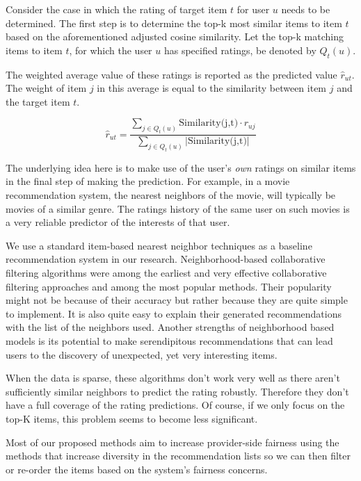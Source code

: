        
        Consider the case in which the rating of target item $t$ for user $u$ needs to be determined. The first step is to determine the top-k most similar items to item $t$ based on the aforementioned adjusted cosine similarity. Let the top-k matching items to item $t$, for which the user $u$ has specified ratings, be denoted by $Q_{t}(u)$.

        The weighted average value of these ratings is reported as the predicted value $\hat{r}_{ut}$. The weight of item $j$ in this average is equal to the similarity between item $j$ and the target item $t$. 
        
        \begin{equation}
            \hat{r}_{ut} = \frac{\sum_{j \in Q_{t}(u)} \text{Similarity(j,t)} \cdot r_{uj}}{\sum_{j \in Q_{t}(u)} |\text{Similarity(j,t)}|}
        \end{equation}
        
        The underlying idea here is to make use of the user’s \textit{own} ratings on similar items in the final step of making the prediction. For example, in a movie recommendation system, the nearest neighbors of the movie, will typically be movies of a similar genre. The ratings history of the same user on such movies is a very reliable predictor of the interests of that user.
        
        We use a standard item-based nearest neighbor techniques \cite{desrosiers2011comprehensive} as a baseline recommendation system in our research. Neighborhood-based collaborative filtering algorithms were among the earliest and very effective collaborative filtering approaches and among the most popular methods. Their popularity might not be because of their accuracy but rather because they are quite simple to implement. It is also quite easy to explain their generated recommendations with the list of the neighbors used. Another strengths of neighborhood based models is its potential to make serendipitous recommendations that can lead users to the discovery of unexpected, yet very interesting items.
        
        When the data is sparse, these algorithms don't work very well as there aren't sufficiently similar neighbors to predict the rating robustly. Therefore they don't have a full coverage of the rating predictions. Of course, if we only focus on the top-K items, this problem seems to become less significant.
        
        Most of our proposed methods aim to increase provider-side fairness using the methods that increase diversity in the recommendation lists so we can then filter or re-order the items based on the system's fairness concerns. 
        
